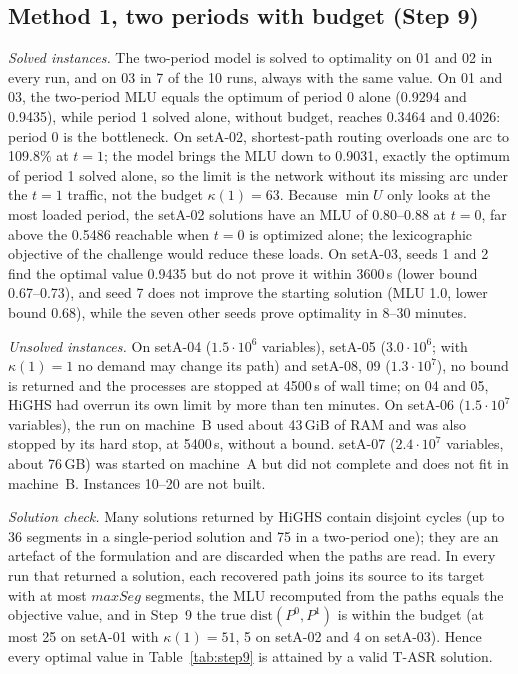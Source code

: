 \documentclass[conference]{IEEEtran}
\begin{document}
\subsection{Method 1, two periods with budget (Step 9)}
\emph{Solved instances.} The two-period model is solved to optimality on 01 and 02 in every run, and on 03 in 7 of the 10 runs, always with the same value. On 01 and 03, the two-period MLU equals the optimum of period 0 alone (0.9294 and 0.9435), while period 1 solved alone, without budget, reaches 0.3464 and 0.4026: period 0 is the bottleneck. On setA-02, shortest-path routing overloads one arc to 109.8\% at $t=1$; the model brings the MLU down to 0.9031, exactly the optimum of period 1 solved alone, so the limit is the network without its missing arc under the $t=1$ traffic, not the budget $\kappa(1)=63$. Because $\min U$ only looks at the most loaded period, the setA-02 solutions have an MLU of 0.80--0.88 at $t=0$, far above the 0.5486 reachable when $t=0$ is optimized alone; the lexicographic objective of the challenge would reduce these loads. On setA-03, seeds 1 and 2 find the optimal value 0.9435 but do not prove it within 3600\,s (lower bound 0.67--0.73), and seed 7 does not improve the starting solution (MLU 1.0, lower bound 0.68), while the seven other seeds prove optimality in 8--30 minutes.

\emph{Unsolved instances.} On setA-04 ($1.5\cdot10^6$ variables), setA-05 ($3.0\cdot10^6$; with $\kappa(1)=1$ no demand may change its path) and setA-08, 09 ($1.3\cdot10^7$), no bound is returned and the processes are stopped at 4500\,s of wall time; on 04 and 05, HiGHS had overrun its own limit by more than ten minutes. On setA-06 ($1.5\cdot10^7$ variables), the run on machine~B used about 43\,GiB of RAM and was also stopped by its hard stop, at 5400\,s, without a bound. setA-07 ($2.4\cdot10^7$ variables, about 76\,GB) was started on machine~A but did not complete and does not fit in machine~B. Instances 10--20 are not built.

\emph{Solution check.} Many solutions returned by HiGHS contain disjoint cycles (up to 36 segments in a single-period solution and 75 in a two-period one); they are an artefact of the formulation and are discarded when the paths are read. In every run that returned a solution, each recovered path joins its source to its target with at most $maxSeg$ segments, the MLU recomputed from the paths equals the objective value, and in Step~9 the true $\mathrm{dist}(P^0,P^1)$ is within the budget (at most 25 on setA-01 with $\kappa(1)=51$, 5 on setA-02 and 4 on setA-03). Hence every optimal value in Table~\ref{tab:step9} is attained by a valid T-ASR solution.
\end{document}
